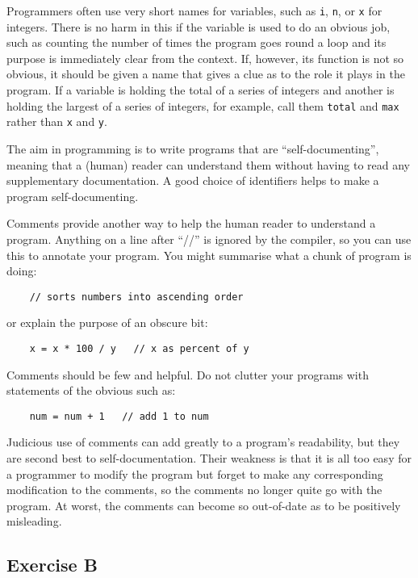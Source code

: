 Programmers often use very short names for variables, such as
\verb!i!, \verb!n!, or 
\verb!x! for integers.  There is no harm in this if the variable is used to
do an obvious job, such as counting the number of times the program goes round
a loop and its purpose is immediately clear from the context.  If, however, its
function is not so obvious, it should be given a name that
gives a clue as to the role it plays in the program.  If a variable is
holding the total of a series of integers and another is holding the
largest of a series of integers, for example, call them \verb!total!
and \verb!max! rather than \verb!x! and \verb!y!.

The aim in programming is to write programs that are ``self-documenting'',
meaning that a (human) reader can understand them without having to read
any supplementary documentation.  A good choice of identifiers helps to
make a program self-documenting.

Comments provide another way to help the human reader to understand a
program.  Anything on a line after ``//'' is ignored by the compiler,
so you can use this to annotate your program.  You might summarise
what a chunk of program is doing:

\begin{Verbatim}
    // sorts numbers into ascending order
\end{Verbatim}

or explain the purpose of an obscure bit:

\begin{Verbatim}
    x = x * 100 / y   // x as percent of y
\end{Verbatim}

Comments should be few and helpful.  Do not clutter your programs with
statements of the obvious such as:

\begin{Verbatim}
    num = num + 1   // add 1 to num
\end{Verbatim}

Judicious use of comments can add greatly to a program's readability, but they
are second best to self-documentation.  Their weakness is that it is all too
easy for a programmer to modify the program but forget to make any
corresponding modification to the comments, so the comments no longer quite
go with the program.  At worst, the comments can become so out-of-date as
to be positively misleading.

\subsection*{Exercise B}


